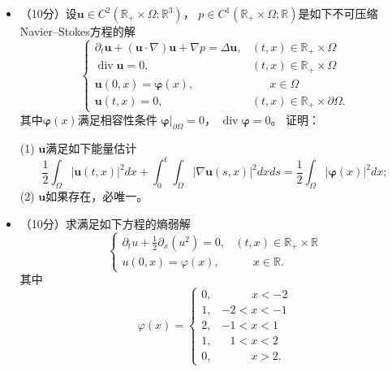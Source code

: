 \begin{itemize}
    \item[6.]（10分）设$\boldsymbol{u}\in C^2(\mathbb{R}_+\times\Omega;\mathbb{R}^3)$，
    $p\in C^1(\mathbb{R}_+\times\Omega;\mathbb{R})$是如下不可压缩Navier--Stokes方程的解
     $$\begin{cases}
        \partial_t\boldsymbol{u}+(\boldsymbol{u}\cdot\nabla)\boldsymbol{u}+\nabla p=\Delta\boldsymbol{u},&(t,x)\in\mathbb{R}_+\times\Omega\\
        \operatorname{div}\boldsymbol{u}=0,&(t,x)\in\mathbb{R}_+\times\Omega\\
        \boldsymbol{u}(0,x)=\boldsymbol{\varphi}(x),&\quad\;\,\,x\in\Omega\\
        \boldsymbol{u}(t,x)=0,&(t,x)\in\mathbb{R}_+\times\partial\Omega.
    \end{cases}$$
    其中$\boldsymbol{\varphi}(x)$满足相容性条件
    $\boldsymbol{\varphi}|_{\partial\Omega}=0$，
    $\operatorname{div}\boldsymbol{\varphi}=0$。
    证明：

    (1) $\boldsymbol{u}$满足如下能量估计
    $$\frac{1}{2}\int_\Omega |\boldsymbol{u}(t,x)|^2 dx+\int_0^t {\int_\Omega |\nabla\boldsymbol{u}(s,x)|^2 dx} ds
    =\frac{1}{2}\int_\Omega |\boldsymbol{\varphi}(x)|^2 dx;$$
    (2) $\boldsymbol{u}$如果存在，必唯一。

    \item[7.]（10分）求满足如下方程的熵弱解
    $$\begin{cases}
        \partial_tu+\frac{1}{2}\partial_x(u^2)=0,&(t,x)\in\mathbb{R}_+\times\mathbb{R}\\
        u(0,x)=\varphi (x),&\quad\;\,\,x\in\mathbb{R}.
    \end{cases}$$
    其中
    $$\varphi(x)=\begin{cases}
        0,&\qquad\:\:\: x<-2\\
        1,& -2<x<-1\\
        2,& -1<x<1\\
        1,&\;\;\: 1<x<2\\
        0,&\qquad\:\:\, x>2.
    \end{cases}$$
\end{itemize}

